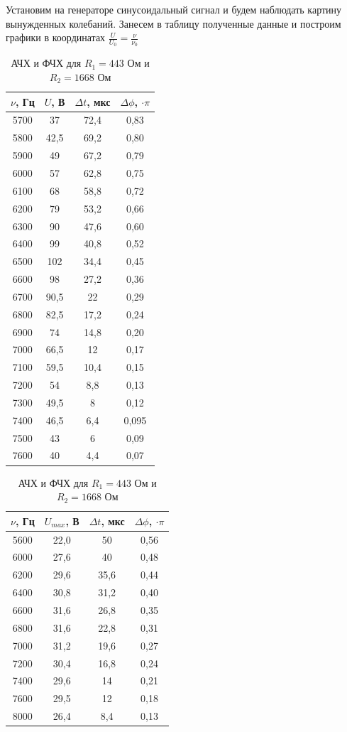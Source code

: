 \documentclass[a4paper, 12pt]{article}
\begin{document}
	Установим на генераторе синусоидальный сигнал и будем наблюдать картину вынужденных колебаний. Занесем в таблицу полученные данные и построим графики в координатах $\frac{U}{U_{0}} = \frac{\nu}{\nu_0}$
	\begin{table}[h]
		\centering
		\begin{tabular}{|c|c|c|c|}
			\hline
			$\nu$, Гц & $U$, В & $\Delta t$, мкс & $\Delta \phi$, $\cdot \pi$ \\ \hline
			5700 & 37 & 72,4 & 0,83 \\ \hline
			5800 & 42,5 & 69,2 & 0,80 \\ \hline
			5900 & 49 & 67,2 & 0,79 \\ \hline
			6000 & 57 & 62,8 & 0,75 \\ \hline
			6100 & 68 & 58,8 & 0,72 \\ \hline
			6200 & 79 & 53,2 & 0,66 \\ \hline
			6300 & 90 & 47,6 & 0,60 \\ \hline
			6400 & 99 & 40,8 & 0,52 \\ \hline
			6500 & 102 & 34,4 & 0,45 \\ \hline
			6600 & 98 & 27,2 & 0,36 \\ \hline
			6700 & 90,5 & 22 & 0,29 \\ \hline
			6800 & 82,5 & 17,2 & 0,24 \\ \hline
			6900 & 74 & 14,8 & 0,20 \\ \hline
			7000 & 66,5 & 12 & 0,17 \\ \hline
			7100 & 59,5 & 10,4& 0,15 \\ \hline
			7200 & 54 & 8,8 & 0,13 \\ \hline
			7300 & 49,5 & 8 & 0,12 \\ \hline
			7400 & 46,5 & 6,4 & 0,095 \\ \hline
			7500 & 43 & 6 & 0,09 \\ \hline
			7600 & 40 & 4,4 & 0,07 \\ \hline
		\end{tabular}
		\hspace{.06\textwidth}
		\begin{tabular}{|c|c|c|c|}
			\hline
			$\nu$, Гц & $U_{max}$, В & $\Delta t$, мкс & $\Delta \phi$, $\cdot \pi$ \\ \hline
			5600 & 22,0 & 50 & 0,56 \\ \hline
			6000 & 27,6 & 40 & 0,48 \\ \hline
			6200 & 29,6 & 35,6 & 0,44 \\ \hline
			6400 & 30,8 & 31,2 & 0,40 \\ \hline
			6600 & 31,6 & 26,8 & 0,35 \\ \hline
			6800 & 31,6 & 22,8 & 0,31 \\ \hline
			7000 & 31,2 & 19,6 & 0,27 \\ \hline
			7200 & 30,4 & 16,8 & 0,24 \\ \hline
			7400 & 29,6 & 14 & 0,21 \\ \hline
			7600 & 29,5 & 12 & 0,18 \\ \hline
			8000 & 26,4 & 8,4 & 0,13 \\ \hline
		\end{tabular}
		\caption{АЧХ и ФЧХ для $R_1 = 443$ Ом и $R_2 = 1668$ Ом}
		

\end{table}
\end{document}
